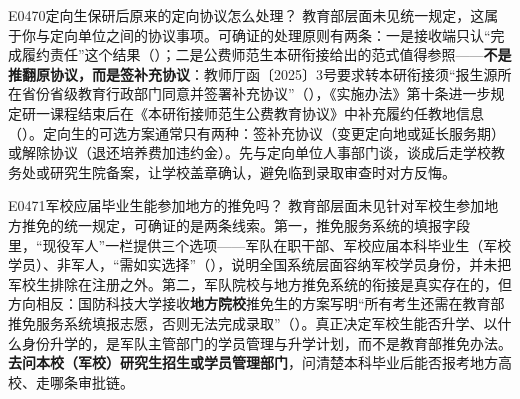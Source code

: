 \begin{qa}{E0470}{定向生保研后原来的定向协议怎么处理？}
教育部层面未见统一规定，这属于你与定向单位之间的协议事项。可确证的处理原则有两条：一是接收端只认“完成履约责任”这个结果（）；二是公费师范生本研衔接给出的范式值得参照——\textbf{不是推翻原协议，而是签补充协议}：教师厅函〔2025〕3号要求转本研衔接须“报生源所在省份省级教育行政部门同意并签署补充协议”（），《实施办法》第十条进一步规定研一课程结束后在《本研衔接师范生公费教育协议》中补充履约任教地信息（）。定向生的可选方案通常只有两种：签补充协议（变更定向地或延长服务期）或解除协议（退还培养费加违约金）。先与定向单位人事部门谈，谈成后走学校教务处或研究生院备案，让学校盖章确认，避免临到录取审查时对方反悔。
\end{qa}

\begin{qa}{E0471}{军校应届毕业生能参加地方的推免吗？}
教育部层面未见针对军校生参加地方推免的统一规定，可确证的是两条线索。第一，推免服务系统的填报字段里，“现役军人”一栏提供三个选项——军队在职干部、军校应届本科毕业生（军校学员）、非军人，“需如实选择”（），说明全国系统层面容纳军校学员身份，并未把军校生排除在注册之外。第二，军队院校与地方推免系统的衔接是真实存在的，但方向相反：国防科技大学接收\textbf{地方院校}推免生的方案写明“所有考生还需在教育部推免服务系统填报志愿，否则无法完成录取”（）。真正决定军校生能否升学、以什么身份升学的，是军队主管部门的学员管理与升学计划，而不是教育部推免办法。\textbf{去问本校（军校）研究生招生或学员管理部门}，问清楚本科毕业后能否报考地方高校、走哪条审批链。
\end{qa}

